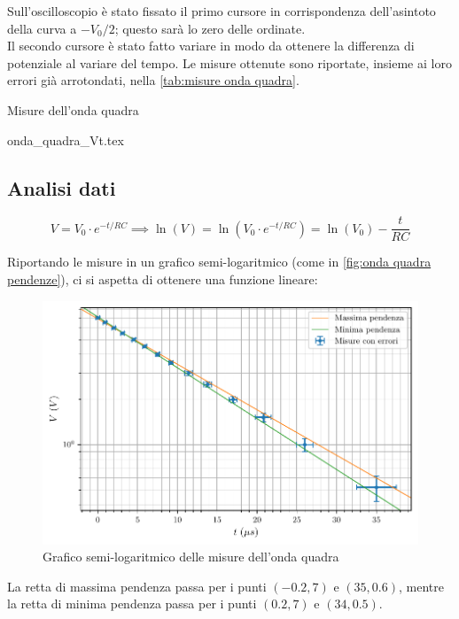 \documentclass[11pt, a4paper]{article}
\numberwithin{equation}{section} %
\begin{document}
Sull'oscilloscopio è stato fissato il primo cursore in corrispondenza dell'asintoto della curva a \(- V_{0}/2\); questo sarà lo zero delle ordinate. \\
Il secondo cursore è stato fatto variare in modo da ottenere la differenza di potenziale al variare del tempo. Le misure ottenute sono riportate, insieme ai loro errori già arrotondati, nella \autoref{tab:misure onda quadra}.

\begin{table}[ht!]
    \centering
    \caption{Misure dell'onda quadra}
    {onda_quadra_Vt.tex}
    \label{tab:misure onda quadra}
\end{table}

\subsection{Analisi dati}

\begin{equation*}
    V = V_{0} \cdot e^{-t/RC} \implies \ln(V) = \ln(V_{0} \cdot e^{-t/RC}) = \ln(V_{0}) - \frac{t}{RC}
\end{equation*}

Riportando le misure in un grafico semi-logaritmico (come in \autoref{fig:onda quadra pendenze}), ci si aspetta di ottenere una funzione lineare:

\begin{figure}[ht!]
    \includegraphics{onda_quadra_V(t)_pendenze.pdf}
    \caption{Grafico semi-logaritmico delle misure dell'onda quadra}
    \label{fig:onda quadra pendenze}
\end{figure}

La retta di massima pendenza passa per i punti \((-0.2, 7)\) e \((35, 0.6)\), mentre la retta di minima pendenza passa per i punti \((0.2, 7)\) e \((34, 0.5)\).
\end{document}
